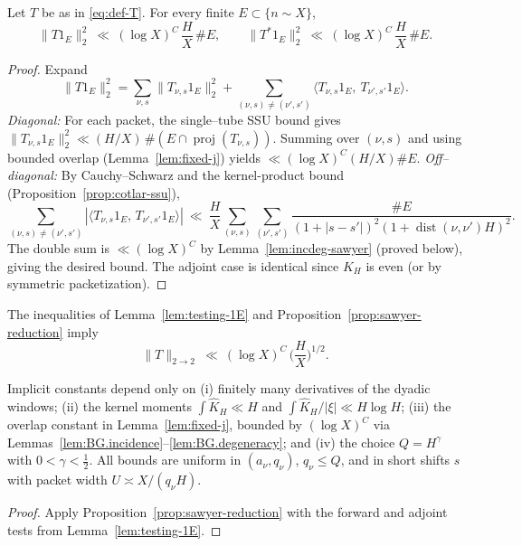 \begin{lemma}[Testing on $1_E$]\label{lem:testing-1E}
Let $T$ be as in \eqref{eq:def-T}. For every finite $E\subset\{n\sim X\}$,
\[
\|T1_E\|_2^2\ \ll\ (\log X)^C\,\frac{H}{X}\,\#E,
\qquad
\|T^\ast 1_E\|_2^2\ \ll\ (\log X)^C\,\frac{H}{X}\,\#E.
\]
\end{lemma}

\begin{proof}
Expand
\[
\|T1_E\|_2^2
=\sum_{\nu,s}\|T_{\nu,s}1_E\|_2^2+\sum_{(\nu,s)\neq(\nu',s')} \langle T_{\nu,s}1_E,\ T_{\nu',s'}1_E\rangle.
\]
\emph{Diagonal:} For each packet, the single–tube SSU bound gives
\(
\|T_{\nu,s}1_E\|_2^2\ll (H/X)\,\#(E\cap \operatorname{proj}(T_{\nu,s})).
\)
Summing over $(\nu,s)$ and using bounded overlap (Lemma~\ref{lem:fixed-j}) yields $\ll (\log X)^C(H/X)\#E$.
\emph{Off–diagonal:} By Cauchy–Schwarz and the kernel-product bound (Proposition~\ref{prop:cotlar-ssu}),
\[
\sum_{(\nu,s)\neq(\nu',s')}
|\langle T_{\nu,s}1_E,\,T_{\nu',s'}1_E\rangle|
\ \ll\ \frac{H}{X}\!\sum_{(\nu,s)}\sum_{(\nu',s')}
\frac{\#E}{(1+|s-s'|)^2(1+\operatorname{dist}(\nu,\nu')H)^2}.
\]
The double sum is $\ll(\log X)^C$ by Lemma~\ref{lem:incdeg-sawyer} (proved below), giving the desired bound.
The adjoint case is identical since $K_H$ is even (or by symmetric packetization).
\end{proof}

\begin{corollary}\label{cor:sawyer-close}
The inequalities of Lemma~\ref{lem:testing-1E} and Proposition~\ref{prop:sawyer-reduction} imply
\[
\|T\|_{2\to 2}\ \ll\ (\log X)^C\,\Big(\frac{H}{X}\Big)^{1/2}.
\]
\end{corollary}

\begin{remark}\label{rem:sawyer-uniform}
Implicit constants depend only on (i) finitely many derivatives of the dyadic windows; 
(ii) the kernel moments $\int \widehat K_H\ll H$ and $\int \widehat K_H/|\xi|\ll H\log H$; 
(iii) the overlap constant in Lemma~\ref{lem:fixed-j}, bounded by $(\log X)^C$ via Lemmas~\ref{lem:BG.incidence}–\ref{lem:BG.degeneracy}; 
and (iv) the choice $Q=H^\gamma$ with $0<\gamma<\tfrac12$. 
All bounds are uniform in $(a_\nu,q_\nu)$, $q_\nu\le Q$, and in short shifts $s$ with packet width $U\asymp X/(q_\nu H)$.
\end{remark}


\begin{proof}
Apply Proposition~\ref{prop:sawyer-reduction} with the forward and adjoint tests from Lemma~\ref{lem:testing-1E}.
\end{proof}

